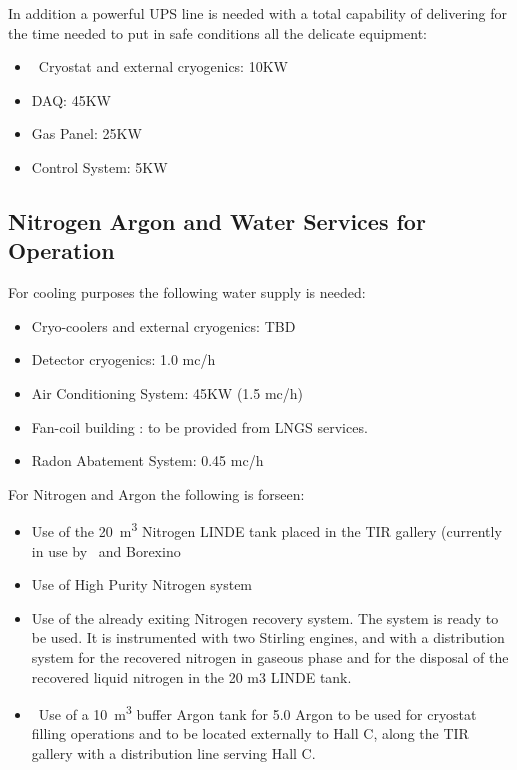 In addition a powerful UPS line is needed with a total capability of delivering \TotalUPSPowerConsumption for 
the time needed to put in safe conditions all the delicate equipment: 
\begin{itemize}
\item Cryostat and external cryogenics: 10KW
\item DAQ: 45KW 
\item Gas Panel: 25KW 
\item Control System: 5KW 
\end{itemize}

\subsection{Nitrogen Argon and Water Services for \DSks Operation}
\label{sec:NitrogenArgonAndWater}

For cooling purposes the following water supply is needed:
\begin{itemize} 
\item Cryo-coolers and external cryogenics: TBD 
\item Detector cryogenics: 1.0 mc/h 
\item Air Conditioning System: 45KW (1.5 mc/h)
\item Fan-coil building : to be provided from LNGS services.
\item Radon Abatement System: 0.45 mc/h 
\end{itemize} 

\vspace{\baselineskip}

For Nitrogen and Argon the following is forseen:
\begin{itemize}
\item Use of the \SI{20}{\cubic\meter} Nitrogen LINDE tank placed in the TIR gallery (currently in use by \DSf\ and Borexino 
\item Use of High Purity Nitrogen system
\item Use of the already exiting Nitrogen recovery system. The system is  ready to be used. It is instrumented with two Stirling engines, and with a distribution system for the recovered nitrogen in gaseous phase and for the disposal of the recovered liquid nitrogen in the 20 m3 LINDE tank.
\item  Use of a \SI{10}{\cubic\meter} buffer Argon tank for 5.0 Argon to be used for cryostat filling operations and to be located externally to Hall C, along the TIR gallery with a distribution line serving Hall C.
\end{itemize}


